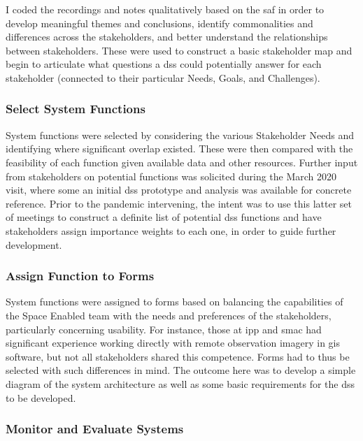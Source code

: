 I coded the recordings and notes qualitatively based on the \ac{saf} in order to develop meaningful themes and conclusions, identify commonalities and differences across the stakeholders, and better understand the relationships between stakeholders. These were used to construct a basic stakeholder map and begin to articulate what questions a \ac{dss} could potentially answer for each stakeholder (connected to their particular Needs, Goals, and Challenges). 

\subsubsection{Select System Functions}

System functions were selected by considering the various Stakeholder Needs and identifying where significant overlap existed. These were then compared with the feasibility of each function given available data and other resources. Further input from stakeholders on potential functions was solicited during the March 2020 visit, where some an initial \ac{dss} prototype and analysis was available for concrete reference. Prior to the pandemic intervening, the intent was to use this latter set of meetings to construct a definite list of potential \ac{dss} functions and have stakeholders assign importance weights to each one, in order to guide further development.

\subsubsection{Assign Function to Forms}

System functions were assigned to forms based on balancing the capabilities of the Space Enabled team with the needs and preferences of the stakeholders, particularly concerning usability. For instance, those at \ac{ipp} and \ac{smac} had significant experience working directly with remote observation imagery in \ac{gis} software, but not all stakeholders shared this competence. Forms had to thus be selected with such differences in mind. The outcome here was to develop a simple diagram of the system architecture as well as some basic requirements for the \ac{dss} to be developed.


\subsubsection{Monitor and Evaluate Systems} \label{sec:rio-monitor-method}

